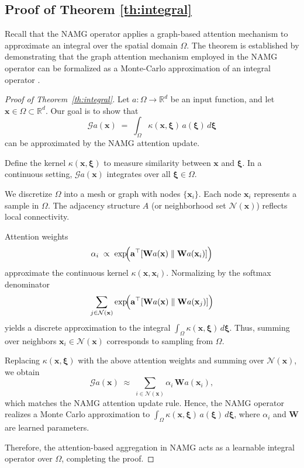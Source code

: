 \subsection{Proof of Theorem \ref{th:integral}} \label{appendix:proof_4}
Recall that the NAMG operator applies a graph-based attention mechanism to approximate an integral over the spatial domain \(\Omega\). The theorem is established by demonstrating that the graph attention mechanism employed in the NAMG operator can be formalized as a Monte-Carlo approximation of an integral operator \cite{21:Choose, 23:no, 24:Transolver,24:AMG}.

\begin{proof}[Proof of Theorem~\ref{th:integral}]
Let \(a:\Omega \to \mathbb{R}^d\) be an input function, and let \(\mathbf{x}\in \Omega\subset\mathbb{R}^d\). Our goal is to show that
\[
    \mathcal{G}a(\mathbf{x})
    \;=\;
    \int_{\Omega} \kappa(\mathbf{x}, \boldsymbol{\xi})\,a(\boldsymbol{\xi})
    \,d\boldsymbol{\xi}
\]
can be approximated by the NAMG attention update.

Define the kernel \(\kappa(\mathbf{x},\boldsymbol{\xi})\) to measure similarity between \(\mathbf{x}\) and \(\boldsymbol{\xi}\). In a continuous setting, \(\mathcal{G}a(\mathbf{x})\) integrates over all \(\boldsymbol{\xi}\in\Omega\).

We discretize \(\Omega\) into a mesh or graph with nodes \(\{\mathbf{x}_i\}\). Each node \(\mathbf{x}_i\) represents a sample in \(\Omega\). The adjacency structure \(A\) (or neighborhood set \(\mathcal{N}(\mathbf{x})\)) reflects local connectivity.

Attention weights 
\[
    \alpha_{i} 
    \;\propto\; 
    \exp\!\Bigl(\mathbf{a}^\top [\mathbf{W}a(\mathbf{x}) \;\|\; \mathbf{W}a(\mathbf{x}_i)]\Bigr)
\]
approximate the continuous kernel \(\kappa(\mathbf{x}, \mathbf{x}_i)\). Normalizing by the softmax denominator
\[
    \sum_{j \in \mathcal{N}(\mathbf{x})}
    \exp\!\Bigl(\mathbf{a}^\top [\mathbf{W}a(\mathbf{x}) \;\|\; \mathbf{W}a(\mathbf{x}_j)]\Bigr)
\]
yields a discrete approximation to the integral \(\int_{\Omega} \kappa(\mathbf{x}, \boldsymbol{\xi})\,d\boldsymbol{\xi}\). Thus, summing over neighbors \(\mathbf{x}_i \in \mathcal{N}(\mathbf{x})\) corresponds to sampling from \(\Omega\).

Replacing \(\kappa(\mathbf{x}, \boldsymbol{\xi})\) with the above attention weights and summing over \(\mathcal{N}(\mathbf{x})\), we obtain
\[
    \mathcal{G}a(\mathbf{x})
    \;\approx\;
    \sum_{i \in \mathcal{N}(\mathbf{x})} 
    \alpha_{i} \,\mathbf{W}a(\mathbf{x}_i),
\]
which matches the NAMG attention update rule. Hence, the NAMG operator realizes a Monte Carlo approximation to \(\int_{\Omega} \kappa(\mathbf{x}, \boldsymbol{\xi})\,a(\boldsymbol{\xi})\,d\boldsymbol{\xi}\), where \(\alpha_i\) and \(\mathbf{W}\) are learned parameters.

Therefore, the attention-based aggregation in NAMG acts as a learnable integral operator over \(\Omega\), completing the proof.
\end{proof}
